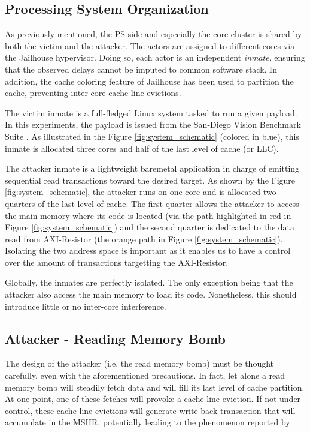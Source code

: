     \subsection{Processing System Organization}
        \label{subsec:processing_system_organization}
        As previously mentioned, the PS side and especially the core cluster is shared by both the victim and the attacker.
        The actors are assigned to different cores via the Jailhouse hypervisor\cite{jailhouse}.
        Doing so, each actor is an independent \emph{inmate}, ensuring that the observed delays cannot be imputed to common software stack.
        In addition, the cache coloring feature of Jailhouse has been used to partition the cache, preventing inter-core cache line evictions.

        The victim inmate is a full-fledged Linux system tasked to run a given payload.
        In this experiments, the payload is issued from the San-Diego Vision Benchmark Suite \cite{SD-VBS}.
        As illustrated in the Figure \ref{fig:system_schematic} (colored in blue), this inmate is allocated three cores and half of the last level of cache (or LLC).

        The attacker inmate is a lightweight baremetal application in charge of emitting sequential read transactions toward the desired target.
        As shown by the Figure \ref{fig:system_schematic}, the attacker runs on one core and is allocated two quarters of the last level of cache.
        The first quarter allows the attacker to access the main memory where its code is located (via the path highlighted in red in Figure \ref{fig:system_schematic}) and the second quarter is dedicated to the data read from AXI-Resistor (the orange path in Figure \ref{fig:system_schematic}).
        Isolating the two address space is important as it enables us to have a control over the amount of transactions targetting the AXI-Resistor.

        Globally, the inmates are perfectly isolated.
        The only exception being that the attacker also access the main memory to load its code.
        Nonetheless, this should introduce little or no inter-core interference.

    \subsection{Attacker - Reading Memory Bomb}
        \label{subsec:attacker_reading_memory_bomb}
        The design of the attacker (i.e. the read memory bomb) must be thought carefully, even with the aforementioned precautions.
        In fact, let alone a read memory bomb will steadily fetch data and will fill its last level of cache partition.
        At one point, one of these fetches will provoke a cache line eviction.
        If not under control, these cache line evictions will generate write back transaction that will accumulate in the MSHR, potentially leading to the phenomenon reported by \cite{Heechul_DDOS_attacks_on_shared_cache}.

